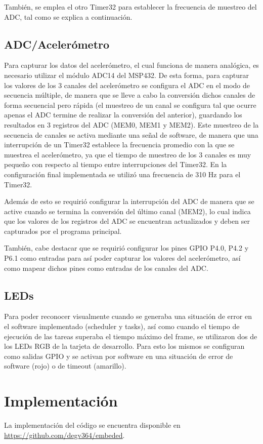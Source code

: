 También, se emplea el otro Timer32 para establecer la frecuencia de muestreo del
ADC, tal como se explica a continuación.

\subsection{ADC/Acelerómetro}
Para capturar los datos del acelerómetro, el cual funciona de manera analógica,
es necesario utilizar el módulo ADC14 del MSP432. De esta forma, para capturar
los valores de los 3 canales del acelerómetro se configura el ADC en el modo de
secuencia múltiple, de manera que se lleve a cabo la conversión dichos canales
de forma secuencial pero rápida (el muestreo de un canal se configura tal que
ocurre apenas el ADC termine de realizar la conversión del anterior), guardando
los resultados en 3 registros del ADC (MEM0, MEM1 y MEM2). Este muestreo de la
secuencia de canales se activa mediante una señal de software, de manera que una
interrupción de un Timer32 establece la frecuencia promedio con la que se
muestrea el acelerómetro, ya que el tiempo de muestreo de los 3 canales es muy
pequeño con respecto al tiempo entre interrupciones del Timer32. En la
configuración final implementada se utilizó una frecuencia de 310 Hz para el
Timer32.

Además de esto se requirió configurar la interrupción del ADC de manera que se
active cuando se termina la conversión del último canal (MEM2), lo cual indica
que los valores de los registros del ADC se encuentran actualizados y deben ser
capturados por el programa principal.

También, cabe destacar que se requirió configurar los pines GPIO P4.0, P4.2 y P6.1
como entradas para así poder capturar los valores del acelerómetro, así como
mapear dichos pines como entradas de los canales del ADC.

\subsection{LEDs}
Para poder reconocer visualmente cuando se generaba una situación de error en el
software implementado (scheduler y tasks), así como cuando el tiempo de
ejecución de las tareas superaba el tiempo máximo del frame, se utilizaron dos
de los LEDs RGB de la tarjeta de desarrollo. Para esto los mismos se configuran
como salidas GPIO y se activan por software en una situación de error de
software (rojo) o de timeout (amarillo).

\section{Implementación}
La implementación del código se encuentra disponible en
\url{https://github.com/degv364/embeded}.

